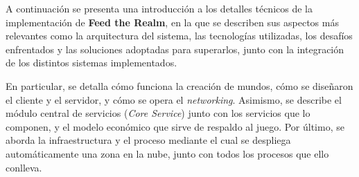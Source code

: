 A continuación se presenta una introducción a los detalles técnicos de la implementación de \textbf{Feed the Realm}, 
en la que se describen sus aspectos más relevantes como la arquitectura del sistema, las tecnologías utilizadas, los 
desafíos enfrentados y las soluciones adoptadas para superarlos, junto con la integración de los distintos sistemas 
implementados.

\vspace{0.25cm}

En particular, se detalla cómo funciona la creación de mundos, cómo se diseñaron el cliente y el servidor, y cómo se
opera el \textit{networking}. Asimismo, se describe el módulo central de servicios (\textit{Core Service}) junto con 
los servicios que lo componen, y el modelo económico que sirve de respaldo al juego. Por último, se aborda la 
infraestructura y el proceso mediante el cual se despliega automáticamente una zona en la nube, junto con todos los 
procesos que ello conlleva.